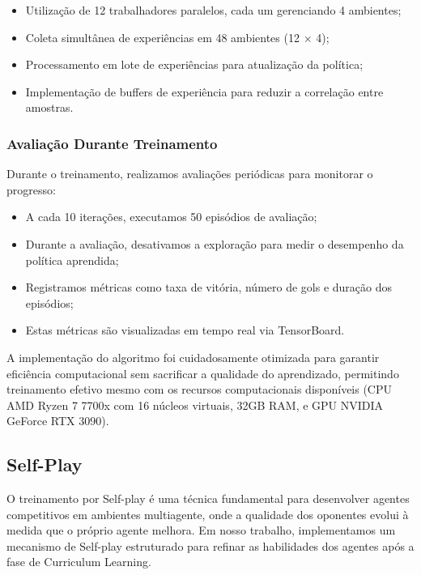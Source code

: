 \begin{itemize}
    \item Utilização de 12 trabalhadores paralelos, cada um gerenciando 4 ambientes;
    \item Coleta simultânea de experiências em 48 ambientes (12 $\times$ 4);
    \item Processamento em lote de experiências para atualização da política;
    \item Implementação de buffers de experiência para reduzir a correlação entre amostras.
\end{itemize}

\subsubsection{Avaliação Durante Treinamento}

Durante o treinamento, realizamos avaliações periódicas para monitorar o progresso:

\begin{itemize}
    \item A cada 10 iterações, executamos 50 episódios de avaliação;
    \item Durante a avaliação, desativamos a exploração para medir o desempenho da política aprendida;
    \item Registramos métricas como taxa de vitória, número de gols e duração dos episódios;
    \item Estas métricas são visualizadas em tempo real via TensorBoard.
\end{itemize}

A implementação do algoritmo foi cuidadosamente otimizada para garantir eficiência computacional sem sacrificar a qualidade do aprendizado, permitindo treinamento efetivo mesmo com os recursos computacionais disponíveis (CPU AMD Ryzen 7 7700x com 16 núcleos virtuais, 32GB RAM, e GPU NVIDIA GeForce RTX 3090).

\subsection{Self-Play}

O treinamento por Self-play é uma técnica fundamental para desenvolver agentes competitivos em ambientes multiagente, onde a qualidade dos oponentes evolui à medida que o próprio agente melhora. Em nosso trabalho, implementamos um mecanismo de Self-play estruturado para refinar as habilidades dos agentes após a fase de Curriculum Learning.

